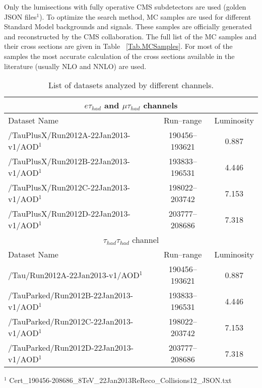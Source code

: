Only the lumisections with fully operative CMS subdetectors are used (golden JSON files$^{1}$). To optimize the search method, MC 
samples are used for different Standard Model backgrounds and signals. These samples are officially generated and reconstructed by the CMS
collaboration. The full list of the MC samples and their cross sections are given in Table ~\ref{Tab.MCSamples}. For most of the samples the most 
accurate calculation of the cross sections available in the literature (usually NLO and NNLO) are used. 



\begin{table}[!h]

\begin{center}
\small{
\begin{tabular}{|l|c|c|}
\hline
\multicolumn{3}{|c|}{$e\tau_{had}$ and $\mu\tau_{had}$ channels} \\
\hline
Dataset Name & Run--range & Luminosity \\
\hline
/TauPlusX/Run2012A-22Jan2013-v1/AOD$^{1}$   & 190456--193621 & 0.887\\
/TauPlusX/Run2012B-22Jan2013-v1/AOD$^{1}$   & 193833--196531 & 4.446\\
/TauPlusX/Run2012C-22Jan2013-v1/AOD$^{1}$   & 198022--203742 & 7.153\\
/TauPlusX/Run2012D-22Jan2013-v1/AOD$^{1}$   & 203777--208686 & 7.318\\
\hline
\hline
\multicolumn{3}{|c|}{$\tau_{had}\tau_{had}$ channel} \\
\hline
Dataset Name & Run--range & Luminosity \\
\hline
/Tau/Run2012A-22Jan2013-v1/AOD$^{1}$   & 190456--193621 & 0.887 \\
/TauParked/Run2012B-22Jan2013-v1/AOD$^{1}$ & 193833--196531 & 4.446 \\
/TauParked/Run2012C-22Jan2013-v1/AOD$^{1}$ & 198022--203742 & 7.153 \\
/TauParked/Run2012D-22Jan2013-v1/AOD$^{1}$ & 203777--208686 & 7.318 \\
\hline

\end{tabular}
}
\end{center}
$^{1}$ Cert\_190456-208686\_8TeV\_22Jan2013ReReco\_Collisions12\_JSON.txt \\
\caption{
  List of datasets analyzed by different channels.
}
\label{Tab.DataSamples}
\end{table}





